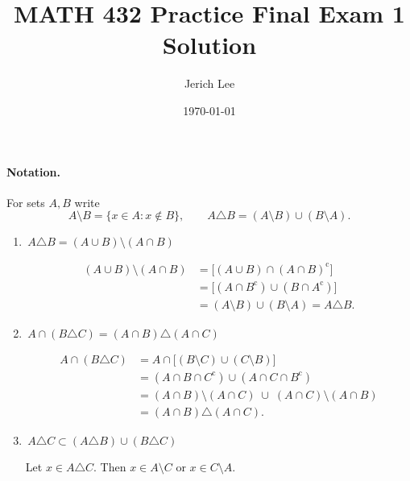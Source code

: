 \documentclass[12pt]{article}
\title{MATH 432 Practice Final Exam 1 Solution}
\author{Jerich Lee}
\date{\today}
\theoremstyle{definition} %
\theoremstyle{plain} %
\begin{document}
\maketitle
\paragraph{Notation.}
For sets \(A,B\) write
\[
   A\setminus B=\{x\in A:x\notin B\},
   \qquad
   A\triangle B=(A\setminus B)\cup(B\setminus A).
\]

\bigskip
\begin{enumerate}[label=\textbf{(\alph*)}]
\item \(\boxed{\,A\triangle B=(A\cup B)\setminus(A\cap B)\,}\)

      \[
      \begin{aligned}
      (A\cup B)\setminus(A\cap B)
           &=\bigl[(A\cup B)\cap(A\cap B)^{\mathrm c}\bigr]          \\[2pt]
           &=\bigl[(A\cap B^{\mathrm c})\cup(B\cap A^{\mathrm c})\bigr] \\[2pt]
           &=(A\setminus B)\cup(B\setminus A)
           =A\triangle B .
      \end{aligned}
      \]

\item \(\boxed{\,A\cap(B\triangle C)=(A\cap B)\triangle(A\cap C)\,}\)

      \[
      \begin{aligned}
      A\cap(B\triangle C)
         &=A\cap\bigl[(B\setminus C)\cup(C\setminus B)\bigr]\\
         &=(A\cap B\cap C^{\mathrm c})\cup(A\cap C\cap B^{\mathrm c})\\
         &=(A\cap B)\setminus(A\cap C)\;\cup\;
           (A\cap C)\setminus(A\cap B)\\
         &=(A\cap B)\triangle(A\cap C).
      \end{aligned}
      \]

\item \(\boxed{\,A\triangle C\subset (A\triangle B)\cup(B\triangle C)\,}\)

      Let \(x\in A\triangle C\).
      Then \(x\in A\setminus C\) or \(x\in C\setminus A\).


\end{enumerate}
\end{document}
